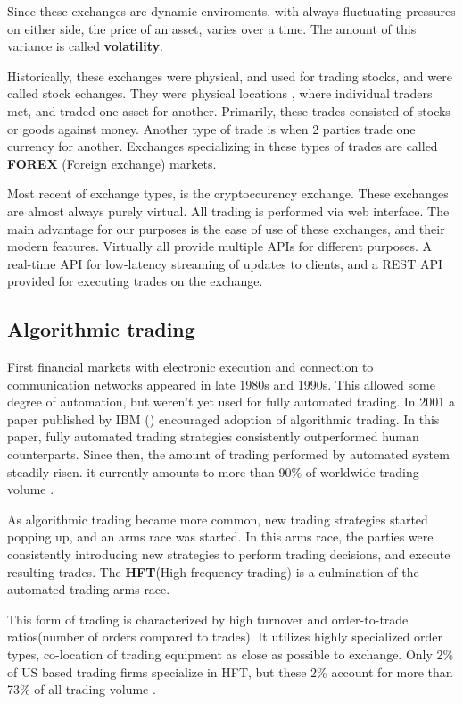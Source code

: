 Since these exchanges are dynamic enviroments, with always fluctuating pressures on either side, the price of an asset, varies over a time.
The amount of this variance is called \textbf{volatility}.

Historically, these exchanges were physical, and used for trading stocks, and
were called stock echanges. They were physical locations , where individual traders  met, and traded one asset for another.
Primarily, these trades consisted of stocks or goods against money. Another type of trade is when 2 parties trade one currency for another.
Exchanges specializing in these types of trades are called \textbf{FOREX} (Foreign exchange) markets.

Most recent of exchange types, is the cryptoccurency exchange. These exchanges are almost always purely virtual. All trading is performed
via web interface. The main advantage for our purposes is the ease of use of these exchanges, and their modern features.
Virtually all provide multiple APIs for different purposes. A real-time API for low-latency streaming of updates to clients,
and a REST API provided for executing trades on the exchange.
\subsection{Algorithmic trading}
First financial markets with electronic execution and connection to communication networks appeared
in late 1980s and 1990s. This allowed some degree of automation, but weren't yet used for fully
automated trading. In 2001 a paper published by IBM ()
encouraged adoption of algorithmic trading. In this paper, fully automated trading strategies
consistently outperformed human counterparts. Since then, the amount of trading performed by
automated system steadily risen. it currently amounts to more than 90\% of worldwide
trading volume .

As algorithmic trading became more common, new trading strategies started popping up, and
an arms race was started. In this arms race, the parties were consistently introducing new
strategies to perform trading decisions, and execute resulting trades. The \textbf{HFT}(High frequency trading)
is a culmination of the automated trading arms race.

This form of trading is characterized by high turnover and order-to-trade ratios(number of orders compared to trades).
It utilizes highly specialized order types, co-location of trading equipment as close as possible to exchange.
Only 2\% of US based trading firms specialize in HFT, but these 2\% account for more than 73\% of all
trading volume .

